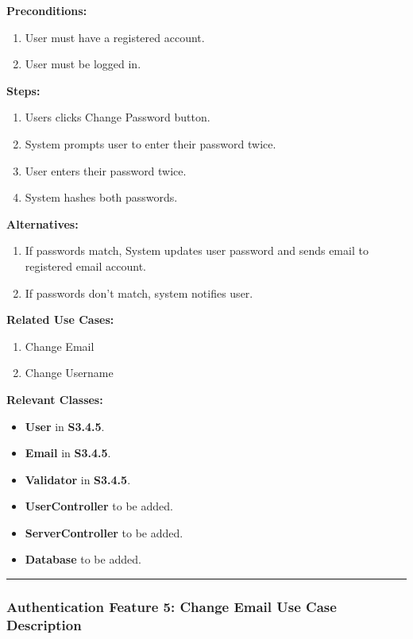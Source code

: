 \documentclass[twoside,letterpaper]{article}
\begin{document}
	\noindent\textbf{Preconditions:}
	\begin{enumerate}
		\item User must have a registered account.
		\item User must be logged in.
	\end{enumerate}
	
	\noindent\textbf{Steps:}
	\begin{enumerate}
		\item Users clicks Change Password button.
		\item System prompts user to enter their password twice.
		\item User enters their password twice.
		\item System hashes both passwords.
	\end{enumerate}
	
	\noindent\textbf{Alternatives:}
	\begin{enumerate}
		\item If passwords match, System updates user password and sends email to registered email account.
		\item If passwords don't match, system notifies user.
	\end{enumerate}
	
	\noindent\textbf{Related Use Cases:}
	\begin{enumerate}
		\item Change Email
		\item Change Username
	\end{enumerate}
	
	\noindent\textbf{Relevant Classes:}
	\begin{itemize}
		\item \textbf{User} in \textbf{S3.4.5}.
		\item \textbf{Email} in \textbf{S3.4.5}.
		\item \textbf{Validator} in \textbf{S3.4.5}.
		\item \textbf{UserController} to be added.
		\item \textbf{ServerController} to be added.
		\item \textbf{Database} to be added.
	\end{itemize}
	\vspace{8pt}
	\hrule
	\newpage
	
	
	\subsubsection[Authentication Feature 5: Change Email Use Case Description]{\rmfamily\bfseries\color{black}
		Authentication Feature 5: Change Email Use Case Description}
		\label{a:uc5}
	\hypertarget{RefHeading22059017292}{}
	
\end{document}
